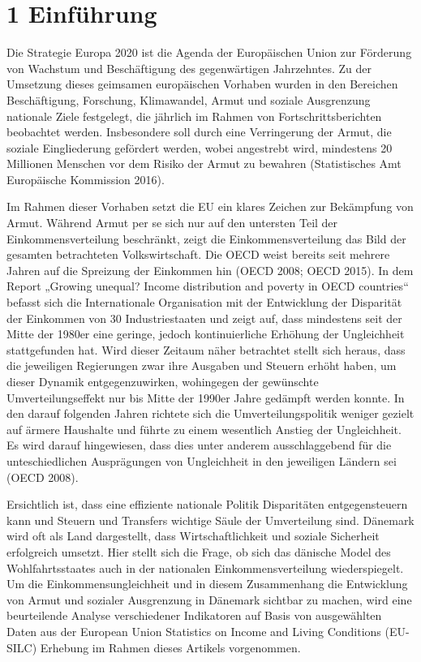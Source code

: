 \documentclass[ngerman,]{article}
\title{}
\author{}
\date{08 Februar, 2019}
\begin{document}
{
\setcounter{tocdepth}{2}
\tableofcontents
}
\newpage

\section{1 Einführung}\label{einfuhrung}

Die Strategie Europa 2020 ist die Agenda der Europäischen Union zur
Förderung von Wachstum und Beschäftigung des gegenwärtigen Jahrzehntes.
Zu der Umsetzung dieses geimsamen europäischen Vorhaben wurden in den
Bereichen Beschäftigung, Forschung, Klimawandel, Armut und soziale
Ausgrenzung nationale Ziele festgelegt, die jährlich im Rahmen von
Fortschrittsberichten beobachtet werden. Insbesondere soll durch eine
Verringerung der Armut, die soziale Eingliederung gefördert werden,
wobei angestrebt wird, mindestens 20 Millionen Menschen vor dem Risiko
der Armut zu bewahren (Statistisches Amt Europäische Kommission 2016).

Im Rahmen dieser Vorhaben setzt die EU ein klares Zeichen zur Bekämpfung
von Armut. Während Armut per se sich nur auf den untersten Teil der
Einkommensverteilung beschränkt, zeigt die Einkommensverteilung das Bild
der gesamten betrachteten Volkswirtschaft. Die OECD weist bereits seit
mehrere Jahren auf die Spreizung der Einkommen hin (OECD 2008; OECD
2015). In dem Report „Growing unequal? Income distribution and poverty
in OECD countries`` befasst sich die Internationale Organisation mit der
Entwicklung der Disparität der Einkommen von 30 Industriestaaten und
zeigt auf, dass mindestens seit der Mitte der 1980er eine geringe,
jedoch kontinuierliche Erhöhung der Ungleichheit stattgefunden hat. Wird
dieser Zeitaum näher betrachtet stellt sich heraus, dass die jeweiligen
Regierungen zwar ihre Ausgaben und Steuern erhöht haben, um dieser
Dynamik entgegenzuwirken, wohingegen der gewünschte Umverteilungseffekt
nur bis Mitte der 1990er Jahre gedämpft werden konnte. In den darauf
folgenden Jahren richtete sich die Umverteilungspolitik weniger gezielt
auf ärmere Haushalte und führte zu einem wesentlich Anstieg der
Ungleichheit. Es wird darauf hingewiesen, dass dies unter anderem
ausschlaggebend für die unteschiedlichen Ausprägungen von Ungleichheit
in den jeweiligen Ländern sei (OECD 2008).

Ersichtlich ist, dass eine effiziente nationale Politik Disparitäten
entgegensteuern kann und Steuern und Transfers wichtige Säule der
Umverteilung sind. Dänemark wird oft als Land dargestellt, dass
Wirtschaftlichkeit und soziale Sicherheit erfolgreich umsetzt. Hier
stellt sich die Frage, ob sich das dänische Model des Wohlfahrtsstaates
auch in der nationalen Einkommensverteilung wiederspiegelt. Um die
Einkommensungleichheit und in diesem Zusammenhang die Entwicklung von
Armut und sozialer Ausgrenzung in Dänemark sichtbar zu machen, wird eine
beurteilende Analyse verschiedener Indikatoren auf Basis von
ausgewählten Daten aus der European Union Statistics on Income and
Living Conditions (EU-SILC) Erhebung im Rahmen dieses Artikels
vorgenommen.
\end{document}
